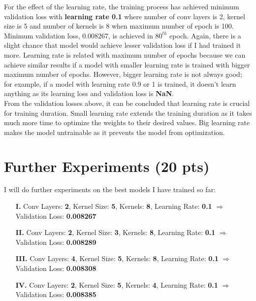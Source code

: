 \documentclass[12pt]{article}
\begin{document}
\begin{itemize}
		For the effect of the learning rate, the training process has achieved minimum validation loss with \textbf{learning rate 0.1} where number of conv layers is 2, kernel size is 5 and number of kernels is 8 when maximum number of epoch is 100. \\
		Minimum validation loss, 0.008267, is achieved in $80^{th}$ epoch. Again, there is a slight chance that model would achieve lesser validation loss if I had trained it more. Learning rate is related with maximum number of epochs because we can achieve similar results if a model with smaller learning rate is trained with bigger maximum number of epochs. However, bigger learning rate is not always good; for example, if a model with learning rate 0.9 or 1 is trained, it doesn't learn anything as its learning loss and validation loss is \textbf{NaN}. \\
		From the validation losses above, it can be concluded that learning rate is crucial for training duration. Small learning rate extends the training duration as it takes much more time to optimize the weights to their desired values. Big learning rate makes the model untrainable as it prevents the model from optimization.

    \end{itemize}


\section{Further Experiments (20 pts)}
    I will do further experiments on the best models I have trained so far:
    
    \begin{enumerate}
        \item[\textbf{I.}] Conv Layers: \textbf{2}, Kernel Size: \textbf{5}, Kernels: \textbf{8}, Learning Rate: \textbf{0.1} $\Rightarrow$ Validation Loss: \textbf{0.008267}
        \item[\textbf{II.}] Conv Layers: \textbf{2}, Kernel Size: \textbf{3}, Kernels: \textbf{8}, Learning Rate: \textbf{0.1} $\Rightarrow$ Validation Loss: \textbf{0.008289}
        \item[\textbf{III.}] Conv Layers: \textbf{4}, Kernel Size: \textbf{5}, Kernels: \textbf{8}, Learning Rate: \textbf{0.1} $\Rightarrow$ Validation Loss: \textbf{0.008308}
        \item[\textbf{IV.}] Conv Layers: \textbf{2}, Kernel Size: \textbf{5}, Kernels: \textbf{4}, Learning Rate: \textbf{0.1} $\Rightarrow$ Validation Loss: \textbf{0.008385}
    \end{enumerate}
    
\end{document}
